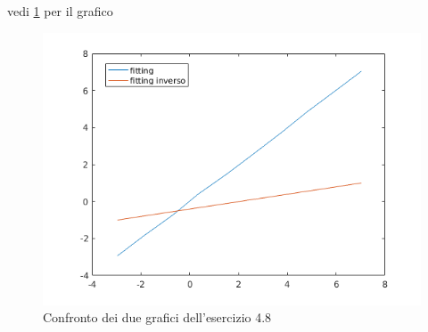 
vedi \ref{fitting} per il grafico
\begin{figure}
\centering
\includegraphics[scale=0.8]{cap_4/es8/untitled}
\caption{Confronto dei due grafici dell'esercizio 4.8}
\label{fitting}
\end{figure}
